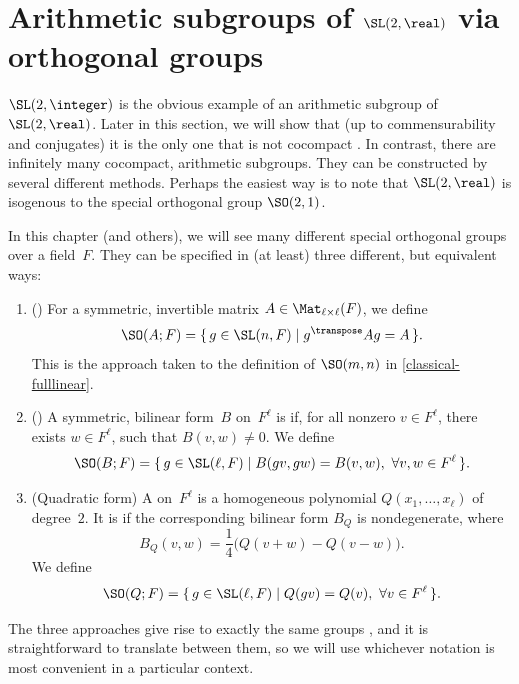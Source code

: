 

\label{EgArithGrpsChap}


\section{Arithmetic subgroups of \texorpdfstring{$\SL(2,\real)$}{SL(2,R)} via orthogonal groups} 
\label{ArithLattSL2}

$\SL(2,\integer)$ is the obvious example of an arithmetic
subgroup of $\SL(2,\real)$. Later in this section, we will show that (up to
commensurability and conjugates) it is the only one that is
not cocompact . In contrast, there are infinitely many
cocompact, arithmetic subgroups. They can be constructed by
several different methods. Perhaps the easiest way is to
note that $\SL(2,\real)$ is isogenous to the special orthogonal group $\SO(2,1)$. 

\begin{notation} \label{SO3wayNotation}
In this chapter (and others), we will see many different special orthogonal groups over a field~$F$.
They can be specified in (at least) three different, but equivalent ways:
	\begin{enumerate}
	
	\item () For a symmetric, invertible matrix $A \in \Mat_{\ell \times \ell}(F)$, we define
	$$ \SO(A;F) = \{\, g \in \SL(n,F) \mid g^\transpose A g = A \,\} .$$
	This is the approach taken to the definition of $\SO(m,n)$ in \cref{classical-fulllinear}.

	\item () A symmetric, bilinear form~$B$ on~$F^\ell$ is  if, for all nonzero $v \in F^\ell$, there exists $w \in F^\ell$, such that $B(v,w) \neq 0$. We define
	$$ \SO(B;F) = \{\, g \in \SL(\ell,F) \mid B(gv,gw) = B(v,w), \ \forall v,w \in F^\ell \,\} .$$

	\item ({Quadratic form}) A  on~$F^\ell$ is a homogeneous polynomial $Q(x_1,\ldots,x_\ell)$ of degree~$2$.  It is  if the corresponding bilinear form $B_Q$ is nondegenerate, where
	$$ B_Q(v,w) = {\textstyle\frac{1}{4}} \bigl( Q(v + w) - Q(v - w) \bigr) .$$
	We define
	 $$ \SO(Q;F) = \{\, g \in \SL(\ell,F) \mid Q(gv) = Q(v), \ \forall v \in F^\ell \,\} .$$

	\end{enumerate}
The three approaches give rise to exactly the same groups , and it is straightforward to translate between them, so we will use whichever notation is most convenient in a particular context.
\end{notation}	

